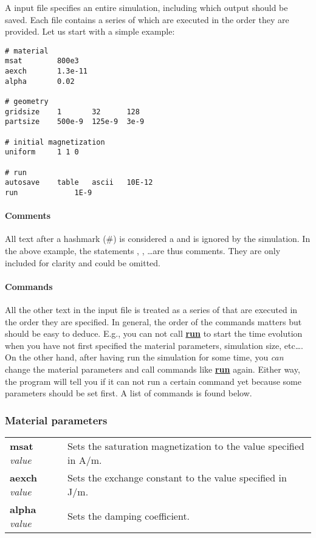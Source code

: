 A \prog input file specifies an entire simulation, including which output should be saved. Each file contains a series of  which are executed in the order they are provided. Let us start with a simple example:


\begin{verbatim}
# material
msat       	800e3 
aexch      	1.3e-11
alpha      	0.02

# geometry 
gridsize	1     	32      128    
partsize	500e-9	125e-9 	3e-9

# initial magnetization
uniform		1 1 0

# run
autosave	table	ascii	10E-12
run          	1E-9
\end{verbatim}

\newcommand{\defcommand}[2][\space]{\textbf{#2}\index{#2}\label{#2} \textit{#1}}
\newcommand{\command}[1]{\hyperref[#1]{\textbf{#1}}\index{#1}\label{#1}}

\paragraph{Comments} All text after a hashmark (\#) is considered a  and is ignored by the simulation. In the above example, the statements , , \ldots are thus comments. They are only included for clarity and could be omitted.

\paragraph{Commands} All the other text in the input file is treated as a series of  that are executed in the order they are specified. In general, the order of the commands matters but should be easy to deduce.  E.g., you can not call \command{run} to start the time evolution when you have not first specified the material parameters, simulation size, etc\ldots. On the other hand, after having {run} the simulation for some time, you \emph{can} change the material parameters and call commands like \command{run} again. Either way, the program will tell you if it can not run a certain command yet because some parameters should be set first. A list of commands is found below.

\subsubsection*{Material parameters}
\begin{tabular}{ll}
\defcommand[value]{msat}  & Sets the saturation magnetization to the value specified in A/m. \\
\defcommand[value]{aexch} & Sets the exchange constant to the value specified in J/m. \\
\defcommand[value]{alpha} & Sets the damping coefficient.
\end{tabular}

